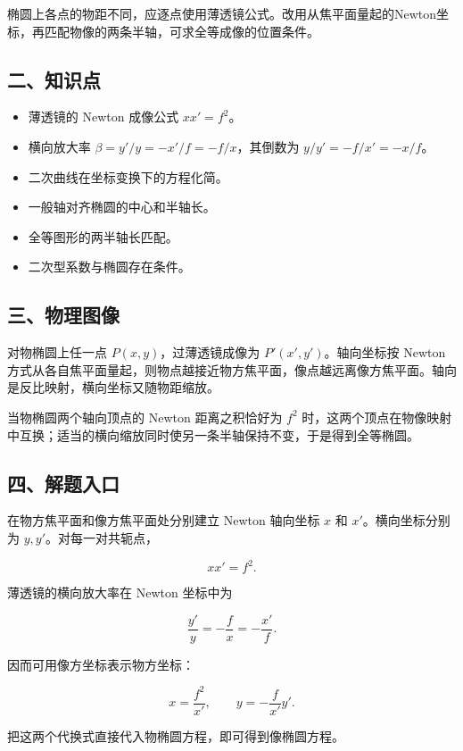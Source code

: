 \documentclass[12pt,a4paper,UTF8]{ctexart}
\newcommand{\tightlist}{\setlength{\itemsep}{0pt}\setlength{\parskip}{0pt}}
\begin{document}
椭圆上各点的物距不同，应逐点使用薄透镜公式。改用从焦平面量起的Newton坐标，再匹配物像的两条半轴，可求全等成像的位置条件。

\subsection{二、知识点}\label{ux4e8cux77e5ux8bc6ux70b9-6}

\begin{itemize}
\tightlist
\item
  薄透镜的 Newton 成像公式 \(xx'=f^2\)。
\item
  横向放大率 \(\beta=y'/y=-x'/f=-f/x\)，其倒数为 \(y/y'=-f/x'=-x/f\)。
\item
  二次曲线在坐标变换下的方程化简。
\item
  一般轴对齐椭圆的中心和半轴长。
\item
  全等图形的两半轴长匹配。
\item
  二次型系数与椭圆存在条件。
\end{itemize}

\subsection{三、物理图像}\label{ux4e09ux7269ux7406ux56feux50cf-6}

对物椭圆上任一点 \(P(x,y)\)，过薄透镜成像为 \(P'(x',y')\)。轴向坐标按
Newton
方式从各自焦平面量起，则物点越接近物方焦平面，像点越远离像方焦平面。轴向是反比映射，横向坐标又随物距缩放。

当物椭圆两个轴向顶点的 Newton 距离之积恰好为 \(f^2\)
时，这两个顶点在物像映射中互换；适当的横向缩放同时使另一条半轴保持不变，于是得到全等椭圆。

\subsection{四、解题入口}\label{ux56dbux89e3ux9898ux5165ux53e3-6}

在物方焦平面和像方焦平面处分别建立 Newton 轴向坐标 \(x\) 和
\(x'\)。横向坐标分别为 \(y,y'\)。对每一对共轭点，

\[xx'=f^2.\]

薄透镜的横向放大率在 Newton 坐标中为

\[\frac{y'}{y}=-\frac{f}{x}=-\frac{x'}f.\]

因而可用像方坐标表示物方坐标：

\[x=\frac{f^2}{x'},\qquad y=-\frac f{x'}y'.\]

把这两个代换式直接代入物椭圆方程，即可得到像椭圆方程。
\end{document}
